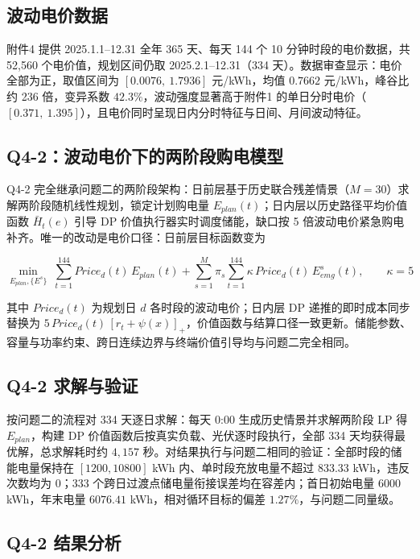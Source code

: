 \documentclass[zihao=-4,a4paper,UTF8,fontset=none]{ctexart}
\begin{document}
\subsection{波动电价数据}

附件4 提供 2025.1.1--12.31 全年 365 天、每天 144 个 10 分钟时段的电价数据，共 52,560 个电价值，规划区间仍取 2025.2.1--12.31（334 天）。数据审查显示：电价全部为正，取值区间为 $[0.0076,\ 1.7936]$ 元/kWh，均值 $0.7662$ 元/kWh，峰谷比约 236 倍，变异系数 $42.3\%$，波动强度显著高于附件1 的单日分时电价（$[0.371,\ 1.395]$），且电价同时呈现日内分时特征与日间、月间波动特征。

\subsection{Q4-2：波动电价下的两阶段购电模型}

Q4-2 完全继承问题二的两阶段架构：日前层基于历史联合残差情景（$M=30$）求解两阶段随机线性规划，锁定计划购电量 $E_{plan}(t)$；日内层以历史路径平均价值函数 $\bar{H}_t(e)$ 引导 DP 价值执行器实时调度储能，缺口按 5 倍波动电价紧急购电补齐。唯一的改动是电价口径：日前层目标函数变为

\begin{equation}
  \min_{E_{plan},\{E^{s}\}}\;
  \sum_{t=1}^{144} Price_d(t)\,E_{plan}(t)
  + \sum_{s=1}^{M}\pi_s \sum_{t=1}^{144} \kappa\, Price_d(t)\, E_{emg}^{s}(t),
  \qquad \kappa=5
  \label{eq:q4_obj}
\end{equation}

其中 $Price_d(t)$ 为规划日 $d$ 各时段的波动电价；日内层 DP 递推的即时成本同步替换为 $5\,Price_d(t)\,[r_t+\psi(x)]_{+}$，价值函数与结算口径一致更新。储能参数、容量与功率约束、跨日连续边界与终端价值引导均与问题二完全相同。

\subsection{Q4-2 求解与验证}

按问题二的流程对 334 天逐日求解：每天 0:00 生成历史情景并求解两阶段 LP 得 $E_{plan}$，构建 DP 价值函数后按真实负载、光伏逐时段执行，全部 334 天均获得最优解，总求解耗时约 $4{,}157$ 秒。对结果执行与问题二相同的验证：全部时段的储能电量保持在 $[1200, 10800]$ kWh 内、单时段充放电量不超过 $833.33$ kWh，违反次数均为 0；333 个跨日过渡点储电量衔接误差均在容差内；首日初始电量 $6000$ kWh，年末电量 $6076.41$ kWh，相对循环目标的偏差 $1.27\%$，与问题二同量级。

\subsection{Q4-2 结果分析}
\end{document}
